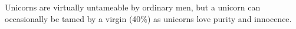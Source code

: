 \begin{multicols*}{2}
\begin{description}
\setlength\itemsep{0pt}

\item[Comments] Unicorns are virtually untameable by ordinary men, but a
unicorn can occasionally be tamed by a virgin (40\%) as unicorns love
purity and innocence.

\end{description}
\end{multicols*}
